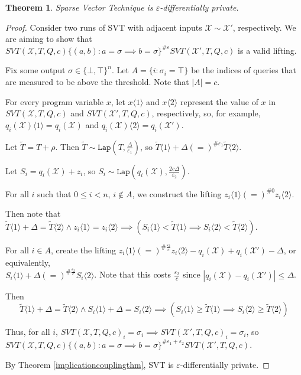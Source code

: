 \documentclass[12pt]{article}
\newcommand{\brangle}[1]{\langle#1 \rangle}
\newcommand{\Lap}{\texttt{Lap}}
\newtheorem{thm}{Theorem}[section]
\theoremstyle{definition}
\begin{document}
\begin{thm}
    Sparse Vector Technique is $\varepsilon$-differentially private. 
\end{thm}

\begin{proof}
    Consider two runs of SVT with adjacent inputs $\mathcal{X}\sim\mathcal{X}'$, respectively. We are aiming to show that $SVT(\mathcal{X}, T, Q, c)\{(a, b): a=\sigma \implies b=\sigma\}^{\#\varepsilon}SVT(\mathcal{X}', T, Q, c)$ is a valid lifting. 

    Fix some output $\sigma \in \{\bot, \top\}^n$. Let $A = \{i:\sigma_i = \top\}$ be the indices of queries that are measured to be above the threshold. Note that $|A| = c$. 
    
    For every program variable $x$, let $x\brangle{1}$ and $x\brangle{2}$ represent the value of $x$ in $SVT(\mathcal{X}, T, Q, c)$ and $SVT(\mathcal{X}', T, Q, c)$, respectively, so, for example, $q_i(\mathcal{X})\brangle{1} = q_i(\mathcal{X})$ and $q_i(\mathcal{X})\brangle{2} = q_i(\mathcal{X}')$. 

    Let $\tilde{T}=T + \rho$. Then $\tilde{T} \sim \Lap(T, \frac{\Delta}{\varepsilon_1})$, so $\tilde{T}\brangle{1} +\Delta (=)^{\#\varepsilon_1}\tilde{T}\brangle{2}$. 

    Let $S_i = q_i(\mathcal{X}) + z_i$, so $S_i \sim\Lap(q_i(\mathcal{X}), \frac{2c\Delta}{\varepsilon_2})$.

    For all $i$ such that $0\leq i < n$, $i\notin A$, we construct the lifting $z_i\brangle{1} (=)^{\#0}z_i\brangle{2}$. 

    Then note that $\tilde{T}\brangle{1}+\Delta = \tilde{T}\brangle{2}\land z_i\brangle{1} = z_i \brangle{2} \implies (S_i\brangle{1} < \tilde{T}\brangle{1} \implies S_i\brangle{2} < \tilde{T}\brangle{2} )$.

    For all $i\in A$, create the lifting $z_i\brangle{1}(=)^{\#\frac{\varepsilon_2}{c}}z_i\brangle{2} - q_i(\mathcal{X})+q_i(\mathcal{X}')-\Delta$, or equivalently, \\$S_i\brangle{1} +\Delta (=)^{\#\frac{\varepsilon_2}{c}} S_i\brangle{2}$. Note that this costs $\frac{\varepsilon_2}{c}$ since $|q_i(\mathcal{X})-q_i(\mathcal{X}')|\leq \Delta$.

    Then \[\tilde{T}\brangle{1} +\Delta = \tilde{T}\brangle{2} \land S_i\brangle{1} + \Delta = S_i\brangle{2} \implies (S_i\brangle{1} \geq \tilde{T}\brangle{1} \implies S_i\brangle{2} \geq \tilde{T}\brangle{2})\]

    Thus, for all $i$, $SVT(\mathcal{X}, T, Q, c)_i = \sigma_i \implies SVT(\mathcal{X}', T, Q, c)_i = \sigma_i$, so $SVT(\mathcal{X}, T, Q, c)\{(a, b): a=\sigma \implies b=\sigma\}^{\#\varepsilon_1+\varepsilon_2}SVT(\mathcal{X}', T, Q, c)$.

    By Theorem \ref{implicationcouplingthm}, SVT is $\varepsilon$-differentially private. 
\end{proof}
\end{document}
